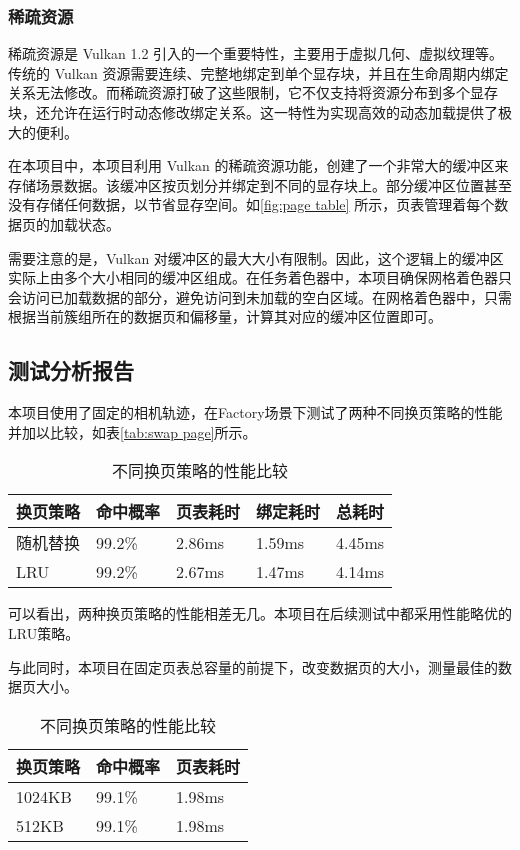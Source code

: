 \subsubsection{稀疏资源}

稀疏资源是 Vulkan 1.2 引入的一个重要特性，主要用于虚拟几何、虚拟纹理等。传统的 Vulkan 资源需要连续、完整地绑定到单个显存块，并且在生命周期内绑定关系无法修改。而稀疏资源打破了这些限制，它不仅支持将资源分布到多个显存块，还允许在运行时动态修改绑定关系。这一特性为实现高效的动态加载提供了极大的便利。

在本项目中，本项目利用 Vulkan 的稀疏资源功能，创建了一个非常大的缓冲区来存储场景数据。该缓冲区按页划分并绑定到不同的显存块上。部分缓冲区位置甚至没有存储任何数据，以节省显存空间。如\autoref{fig:page table} 所示，页表管理着每个数据页的加载状态。

需要注意的是，Vulkan 对缓冲区的最大大小有限制。因此，这个逻辑上的缓冲区实际上由多个大小相同的缓冲区组成。在任务着色器中，本项目确保网格着色器只会访问已加载数据的部分，避免访问到未加载的空白区域。在网格着色器中，只需根据当前簇组所在的数据页和偏移量，计算其对应的缓冲区位置即可。

\subsection{测试分析报告} \label{subsec:streaming test}

本项目使用了固定的相机轨迹，在Factory场景下测试了两种不同换页策略的性能并加以比较，如表\autoref{tab:swap page}所示。

\begin{table}[!htb]
    \caption{\label{tab:swap page}不同换页策略的性能比较}
    \begin{tabularx}{\linewidth}{|X<{\centering}|X<{\centering}|X<{\centering}|X<{\centering}|X<{\centering}|}
        \hline
        换页策略 & 命中概率 & 页表耗时 & 绑定耗时 & 总耗时 \\ \hline
        随机替换 & 99.2\% & 2.86ms & 1.59ms & 4.45ms \\ \hline
        LRU & 99.2\% & 2.67ms & 1.47ms & 4.14ms \\ \hline
    \end{tabularx}
\end{table}

可以看出，两种换页策略的性能相差无几。本项目在后续测试中都采用性能略优的LRU策略。

与此同时，本项目在固定页表总容量的前提下，改变数据页的大小，测量最佳的数据页大小。

\begin{table}[!htb]
    \caption{\label{tab:swap page}不同换页策略的性能比较}
    \begin{tabularx}{\linewidth}{|X<{\centering}|X<{\centering}|X<{\centering}|}
        \hline
        换页策略 & 命中概率 & 页表耗时 \\ \hline
        1024KB & 99.1\% & 1.98ms \\ \hline
        512KB & 99.1\% & 1.98ms \\ \hline
    \end{tabularx}
\end{table}

